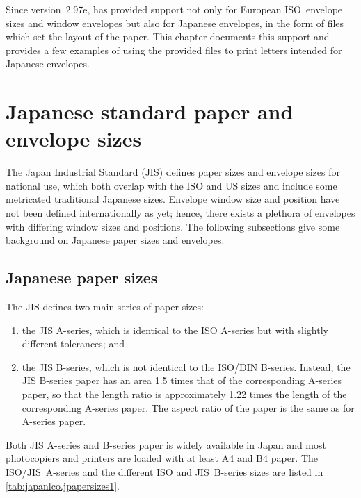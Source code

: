 Since version~2.97e,  has provided support not only for
European ISO~envelope sizes and window envelopes but also for Japanese
envelopes, in the form of  files which set the layout of the paper.
This chapter documents this support and provides a few examples of using the
provided  files to print letters intended for Japanese envelopes.

\section{Japanese standard paper and envelope sizes}

The Japan Industrial Standard (JIS) defines paper sizes and envelope sizes for
national use, which both overlap with the ISO and US sizes and include some
metricated traditional Japanese sizes. Envelope window size and position have
not been defined internationally as yet; hence, there exists a plethora of
envelopes with differing window sizes and positions. The following subsections
give some background on Japanese paper sizes and envelopes.

\subsection{Japanese paper sizes}

The JIS defines two main series of paper sizes:
\begin{enumerate}
\item the JIS A-series, which is identical to the ISO A-series but
  with slightly different tolerances; and
\item the JIS B-series, which is not identical to the ISO/DIN
  B-series. Instead, the JIS B-series paper has an area 1.5 times that
  of the corresponding A-series paper, so that the length ratio is
  approximately 1.22 times the length of the corresponding A-series
  paper. The aspect ratio of the paper is the same as for A-series
  paper.
\end{enumerate}

Both JIS A-series and B-series paper is widely available in Japan and most
photocopiers and printers are loaded with at least A4 and B4 paper. The
ISO/JIS~A-series and the different ISO and JIS~B-series sizes are listed in
\autoref{tab:japanlco.jpapersizes1}.

